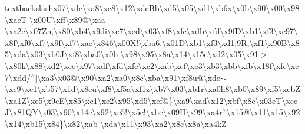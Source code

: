 textbackslash{}x07\textbackslash{}xdc\textbackslash{}xa8\textbackslash{}xc8\textbackslash{}x12\textbackslash{}xdc\+Bb\textbackslash{}xd5\textbackslash{}x05\textbackslash{}xd1\textbackslash{}xb6x\textbackslash{}x0b\textbackslash{}x90\textbackslash{}x00\textbackslash{}x98\textbackslash{}xae\+T\mbox{]}\textbackslash{}x00\+U\textbackslash{}xff\textbackslash{}x89@\textbackslash{}xaa \textbackslash{}xa2e\textbackslash{}x07\+Zn,\textbackslash{}x80\textbackslash{}xb4\textbackslash{}x9di\textbackslash{}xe7\textbackslash{}xed\textbackslash{}x03\textbackslash{}xf8\textbackslash{}xfc\textbackslash{}xdb\textbackslash{}xfd\textbackslash{}x9f\+D\textbackslash{}xb1\textbackslash{}xf3\textbackslash{}xc97\textbackslash{}x8f\textbackslash{}xf0\textbackslash{}xf7\textbackslash{}x9f\textbackslash{}xf7\textbackslash{}xae\textbackslash{}x846\textbackslash{}x00\+X!\textbackslash{}xba6.\textbackslash{}x01\+D\textbackslash{}xb1\textbackslash{}xf3\textbackslash{}xd1;9\+R,\textbackslash{}xf1\textbackslash{}x90\+B\textbackslash{}x85\textbackslash{}xda\textbackslash{}x03\textbackslash{}xb0\+J\textbackslash{}xf8\textbackslash{}xba0\textbackslash{}x0b-\/\textbackslash{}x98\textbackslash{}x95\textbackslash{}x8a\textbackslash{}x14\textbackslash{}x15e\textbackslash{}xd2\textbackslash{}x05\textbackslash{}x91$>$\textbackslash{}x80k\textbackslash{}x88\textbackslash{}xd2\textbackslash{}xce\textbackslash{}x97\textbackslash{}xdf\textbackslash{}xfd\textbackslash{}xfc\textbackslash{}xc2\textbackslash{}xab\textbackslash{}xef\textbackslash{}xe3\textbackslash{}xb3\textbackslash{}xbb\textbackslash{}xfb\textbackslash{}x18f\textbackslash{}xfc\textbackslash{}xc7\textbackslash{}xdd/$^\wedge$$\vert$\textbackslash{}xa3\textbackslash{}x03@\textbackslash{}x90\textbackslash{}xa2\textbackslash{}xa0\textbackslash{}x8c\textbackslash{}xba\textbackslash{}x91\textbackslash{}xf8u@\textbackslash{}xde$\sim$\textbackslash{}xc9\textbackslash{}xe1\textbackslash{}xb57\textbackslash{}x1d\textbackslash{}x8cu\textbackslash{}xf8\textbackslash{}xf5a\textbackslash{}xf1z\textbackslash{}xb7\textbackslash{}x03\textbackslash{}xb1r\textbackslash{}xa0h8\textbackslash{}xb0\textbackslash{}x89\textbackslash{}xf5\textbackslash{}xeb\+Z\textbackslash{}xa1\+Z\textbackslash{}xe5\textbackslash{}x9c\+E\textbackslash{}x85\textbackslash{}xc1\textbackslash{}xe2\textbackslash{}x95\textbackslash{}xd5\textbackslash{}xef@\}\textbackslash{}xa9\textbackslash{}xad\textbackslash{}x12\textbackslash{}xbf\textbackslash{}x8e\textbackslash{}x03e\+T\textbackslash{}xcc\+J\textbackslash{}x81\+Q\+Y\textbackslash{}x03\textbackslash{}x90\textbackslash{}x14e\textbackslash{}x92\textbackslash{}xe5!\textbackslash{}x5c!\textbackslash{}xbe\textbackslash{}x09\+H\textbackslash{}x99\textbackslash{}xa4r\`{}\textbackslash{}x15@\textbackslash{}x11\textbackslash{}x15\textbackslash{}x92\textbackslash{}x14\textbackslash{}xb15\textbackslash{}x84\}\textbackslash{}x82\textbackslash{}xab \textbackslash{}xda\textbackslash{}x11\textbackslash{}x93\textbackslash{}xa2\textbackslash{}x8c\textbackslash{}x8a\textbackslash{}xa4k\+Z 